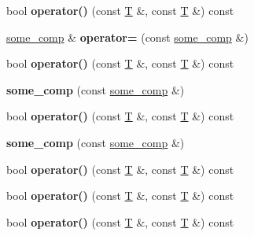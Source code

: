 \begin{DoxyCompactItemize}
\item 
\mbox{\label{structsome__comp_a6a7124af43ee189c025dee7d7482eaba}} 
bool {\bfseries operator()} (const \mbox{\hyperlink{struct_t}{T}} \&, const \mbox{\hyperlink{struct_t}{T}} \&) const
\item 
\mbox{\label{structsome__comp_a3cf31772d92b1481d71121d650f28a01}} 
\mbox{\hyperlink{structsome__comp}{some\+\_\+comp}} \& {\bfseries operator=} (const \mbox{\hyperlink{structsome__comp}{some\+\_\+comp}} \&)
\item 
\mbox{\label{structsome__comp_a6a7124af43ee189c025dee7d7482eaba}} 
bool {\bfseries operator()} (const \mbox{\hyperlink{struct_t}{T}} \&, const \mbox{\hyperlink{struct_t}{T}} \&) const
\item 
\mbox{\label{structsome__comp_acb6b551db492c34e1354464e12b57857}} 
{\bfseries some\+\_\+comp} (const \mbox{\hyperlink{structsome__comp}{some\+\_\+comp}} \&)
\item 
\mbox{\label{structsome__comp_a6a7124af43ee189c025dee7d7482eaba}} 
bool {\bfseries operator()} (const \mbox{\hyperlink{struct_t}{T}} \&, const \mbox{\hyperlink{struct_t}{T}} \&) const
\item 
\mbox{\label{structsome__comp_acb6b551db492c34e1354464e12b57857}} 
{\bfseries some\+\_\+comp} (const \mbox{\hyperlink{structsome__comp}{some\+\_\+comp}} \&)
\item 
\mbox{\label{structsome__comp_a6a7124af43ee189c025dee7d7482eaba}} 
bool {\bfseries operator()} (const \mbox{\hyperlink{struct_t}{T}} \&, const \mbox{\hyperlink{struct_t}{T}} \&) const
\item 
\mbox{\label{structsome__comp_a6a7124af43ee189c025dee7d7482eaba}} 
bool {\bfseries operator()} (const \mbox{\hyperlink{struct_t}{T}} \&, const \mbox{\hyperlink{struct_t}{T}} \&) const
\item 
\mbox{\label{structsome__comp_a6a7124af43ee189c025dee7d7482eaba}} 
bool {\bfseries operator()} (const \mbox{\hyperlink{struct_t}{T}} \&, const \mbox{\hyperlink{struct_t}{T}} \&) const

\end{DoxyCompactItemize}
